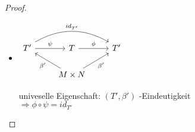 \documentclass[../main.tex]{subfiles}
\begin{document}
\begin{proof}
\begin{itemize}
        \item $%
\begin{tikzcd}
T' \arrow[r, "\psi"] \arrow[rr, "id_{T'}", bend left, shift left] & T \arrow[r, "\phi"]                                  & T' \\
& M\times N \arrow[ru, "\beta'"'] \arrow[lu, "\beta'"] &   
\end{tikzcd}$ \begin{minipage}{0.5\textwidth}
    univeselle Eigenschaft: $(T',\beta')$ -Eindeutigkeit\\ $\Rightarrow \phi\circ \psi = id_{T'}$
\end{minipage}
    \end{itemize}
\end{proof}
\end{document}
